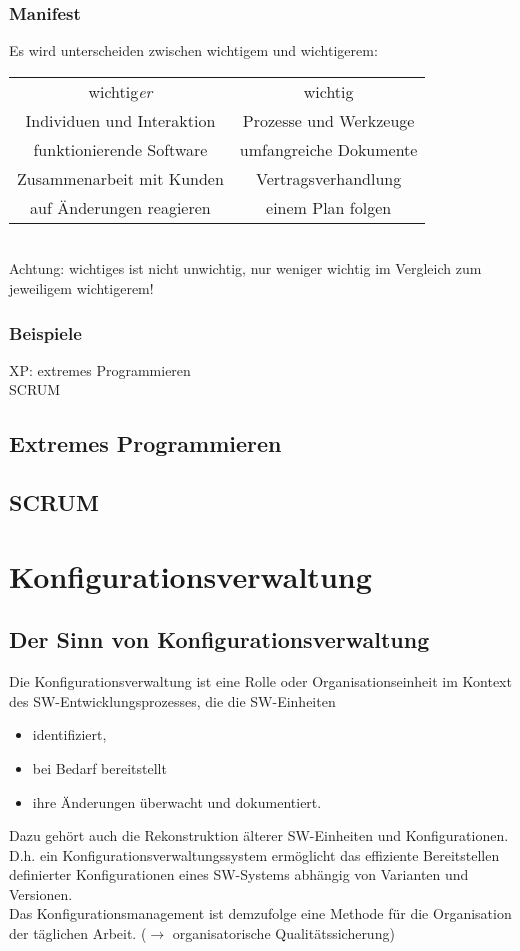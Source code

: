 \subsection{Manifest}
Es wird unterscheiden zwischen wichtigem und wichtigerem:\\
\begin{tabular}{c c}
wichtig\emph{er} & wichtig\\
Individuen und Interaktion & Prozesse und Werkzeuge\\
funktionierende Software & umfangreiche Dokumente\\
Zusammenarbeit mit Kunden & Vertragsverhandlung\\
auf Änderungen reagieren & einem Plan folgen
\end{tabular}\\
Achtung: wichtiges ist nicht unwichtig, nur weniger wichtig im Vergleich zum jeweiligem wichtigerem!

\subsection{Beispiele}
XP: extremes Programmieren\\
SCRUM

\section{Extremes Programmieren}

\section{SCRUM}






\chapter{Konfigurationsverwaltung}

\section{Der Sinn von Konfigurationsverwaltung}
Die Konfigurationsverwaltung ist eine Rolle oder Organisationseinheit im Kontext des SW-Entwicklungsprozesses, die die SW-Einheiten
\begin{itemize}
\item identifiziert,
\item bei Bedarf bereitstellt
\item ihre Änderungen überwacht und dokumentiert.
\end{itemize}
Dazu gehört auch die Rekonstruktion älterer SW-Einheiten und Konfigurationen.\\
D.h. ein Konfigurationsverwaltungssystem ermöglicht das effiziente Bereitstellen definierter
Konfigurationen eines SW-Systems abhängig von Varianten und Versionen.\\
Das Konfigurationsmanagement ist demzufolge eine Methode für die Organisation der täglichen
Arbeit. ($\to$ organisatorische Qualitätssicherung)

